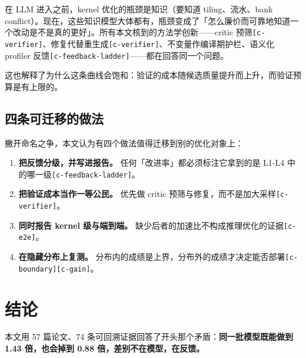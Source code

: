 在 LLM 进入之前，kernel 优化的瓶颈是知识（要知道 tiling、流水、bank conflict）。现在，这些知识模型大体都有，瓶颈变成了「怎么廉价而可靠地知道一个改动是不是真的更好」。所有本文核到的方法学创新——critic 预筛{\scriptsize\texttt{[c-\hspace{0pt}verifier]}}、修复代替重生成{\scriptsize\texttt{[c-\hspace{0pt}verifier]}}、不变量作编译期护栏、语义化 profiler 反馈{\scriptsize\texttt{[c-\hspace{0pt}feedback-\hspace{0pt}ladder]}}——都在回答同一个问题。


这也解释了为什么这条曲线会饱和：验证的成本随候选质量提升而上升，而验证预算是有上限的。


\subsection{四条可迁移的做法}

撇开命名之争，本文认为有四个做法值得迁移到别的优化对象上：


\begin{enumerate}
  \item \textbf{把反馈分级，并写进报告。} 任何「改进率」都必须标注它拿到的是 L1-\hspace{0pt}L4 中的哪一级{\scriptsize\texttt{[c-\hspace{0pt}feedback-\hspace{0pt}ladder]}}。
  \item \textbf{把验证成本当作一等公民。} 优先做 critic 预筛与修复，而不是加大采样{\scriptsize\texttt{[c-\hspace{0pt}verifier]}}。
  \item \textbf{同时报告 kernel 级与端到端。} 缺少后者的加速比不构成推理优化的证据{\scriptsize\texttt{[c-\hspace{0pt}e2e]}}。
  \item \textbf{在隐藏分布上复测。} 分布内的成绩是上界，分布外的成绩才决定能否部署{\scriptsize\texttt{[c-\hspace{0pt}boundary]}}{\scriptsize\texttt{[c-\hspace{0pt}gain]}}。
\end{enumerate}

\section{结论}

本文用 57 篇论文、74 条可回溯证据回答了开头那个矛盾：\textbf{同一批模型既能做到 1.43 倍，也会掉到 0.88 倍，差别不在模型，在反馈。}


